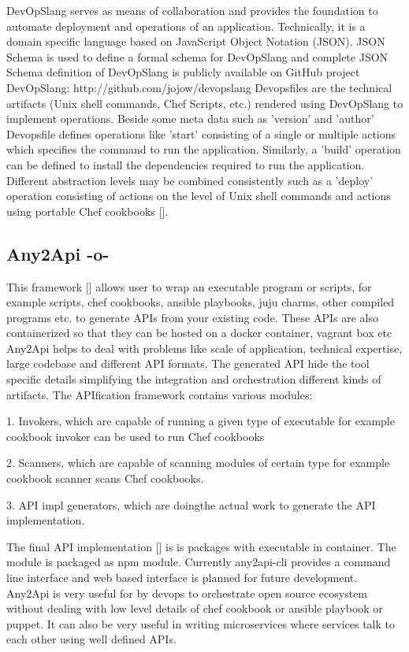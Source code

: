 DevOpSlang serves as means of collaboration and provides the
foundation to automate deployment and operations of an
application. Technically, it is a domain specific language based on
JavaScript Object Notation (JSON). JSON Schema is used to define a
formal schema for DevOpSlang and complete JSON Schema definition of
DevOpSlang is publicly available on GitHub project DevOpSlang:
http://github.com/jojow/devopslang Devopsfiles are the technical
artifacts (Unix shell commands, Chef Scripts, etc.)  rendered using
DevOpSlang to implement operations.  Beside some meta data such as
'version' and 'author' Devopsfile defines operations like 'start'
consisting of a single or multiple actions which specifies the command
to run the application. Similarly, a 'build' operation can be defined
to install the dependencies required to run the application. Different
abstraction levels may be combined consistently such as a 'deploy'
operation consisting of actions on the level of Unix shell commands
and actions using portable Chef cookbooks [\cite{DevOpSlang}].

\subsection{Any2Api -o-}

This framework [\cite{wettinger-any2api}] allows user to wrap an
executable program or scripts, for example scripts, chef cookbooks,
ansible playbooks, juju charms, other compiled programs etc. to
generate APIs from your existing code.  These APIs are also
containerized so that they can be hosted on a docker container,
vagrant box etc Any2Api helps to deal with problems like scale of
application, technical expertise, large codebase and different API
formats. The generated API hide the tool specific details simplifying
the integration and orchestration different kinds of artifacts. The
APIfication framework contains various modules:

     1. Invokers, which are capable of running a given type of
        executable for example cookbook invoker can be used to run Chef
        cookbooks

     2. Scanners, which are capable of scanning modules of certain type for
        example cookbook scanner scans Chef cookbooks.

     3. API impl generators, which are doingthe actual work to
        generate the API implementation.

        The final API implementation [\cite{www-any2api}] is is packages
        with executable in container.  The module is packaged as npm
        module. Currently any2api-cli provides a command line
        interface and web based interface is planned for future
        development. Any2Api is very useful for by devops to
        orchestrate open source ecosystem without dealing with low
        level details of chef cookbook or ansible playbook or
        puppet. It can also be very useful in writing microservices
        where services talk to each other using well defined APIs.

